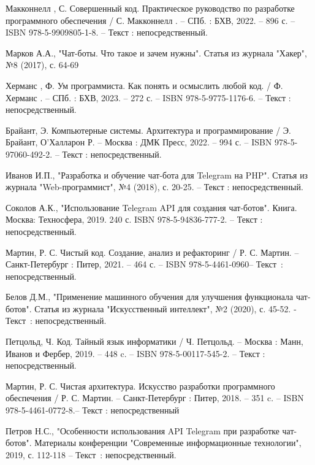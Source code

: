 \newsection
{}

\begin{thebibliography}{9}

 Макконнелл , С. Совершенный код. Практическое руководство по разработке программного обеспечения / С. Макконнелл . – СПб. : БХВ, 2022. – 896 с. – ISBN 978-5-9909805-1-8. – Текст : непосредственный.

 Марков А.А., "Чат-боты. Что такое и зачем нужны". Статья из журнала "Хакер", №8 (2017), с. 64-69

	Херманс , Ф. Ум программиста. Как понять и осмыслить любой код. / Ф. Херманс . – СПб. : БХВ, 2023. – 272 с. – ISBN 978-5-9775-1176-6. – Текст :
непосредственный.


 Брайант, Э. Компьютерные системы. Архитектура и программирование / Э. Брайант, О’Халларон Р. – Москва : ДМК Пресс, 2022. – 994 с. – ISBN 978-5-97060-492-2. – Текст : непосредственный.

	Иванов И.П., "Разработка и обучение чат-бота для Telegram на PHP". Статья из журнала "Web-программист", №4 (2018), с. 20-25. – Текст : непосредственный.

	Соколов А.К., "Использование Telegram API для создания чат-ботов". Книга. Москва: Техносфера, 2019. 240 с. ISBN 978-5-94836-777-2. – Текст : непосредственный.

	Мартин, Р. С. Чистый код. Создание, анализ и рефакторинг / Р. С. Мартин. – Санкт-Петербург : Питер, 2021. – 464 с. – ISBN 978-5-4461-0960– Текст~: непосредственный.

	Белов Д.М., "Применение машинного обучения для улучшения функционала чат-ботов". Статья из журнала "Искусственный интеллект", №2 (2020), с. 45-52. - Текст~: непосредственный.

	Петцольд, Ч. Код. Тайный язык информатики / Ч. Петцольд. – Москва
: Манн, Иванов и Фербер, 2019. – 448 c. – ISBN 978-5-00117-545-2. – Текст : непосредственный.


 Мартин, Р. С. Чистая архитектура. Искусство разработки программного обеспечения / Р. С. Мартин. – Санкт-Петербург : Питер, 2018. – 351 c. – ISBN 978-5-4461-0772-8.– Текст : непосредственный

 Петров Н.С., "Особенности использования API Telegram при разработке чат-ботов". Материалы конференции "Современные информационные технологии", 2019, с. 112-118 – Текст~: непосредственный.


\end{thebibliography}
